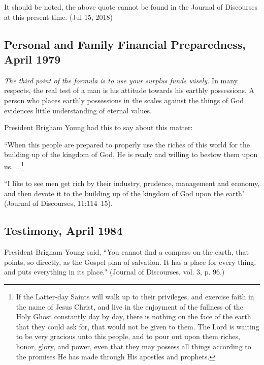 It should be noted, the above quote cannot be found in the Journal of Discourses at this present time. (Jul 15, 2018)

\subsection{Personal and Family Financial Preparedness, April 1979}

\textit{The third point of the formula is to use your surplus funds wisely.} In many respects, the real test of a man is his attitude towards his earthly possessions. A person who places earthly possessions in the scales against the things of God evidences little understanding of eternal values.

President Brigham Young had this to say about this matter:

``When this people are prepared to properly use the riches of this world for the building up of the kingdom of God, He is ready and willing to bestow them upon us. ...\footnote{If the Latter-day Saints will walk up to their privileges, and exercise faith in the name of Jesus Christ, and live in the enjoyment of the fullness of the Holy Ghost constantly day by day, there is nothing on the face of the earth that they could ask for, that would not be given to them. The Lord is waiting to be very gracious unto this people, and to pour out upon them riches, honor, glory, and power, even that they may possess all things according to the promises He has made through His apostles and prophets.}

``I like to see men get rich by their industry, prudence, management and economy, and then devote it to the building up of the kingdom of God upon the earth" (Journal of Discourses, 11:114–15).

\subsection{Testimony, April 1984}

President Brigham Young said, ``You cannot find a compass on the earth, that points, so directly, as the Gospel plan of salvation. It has a place for every thing, and puts everything in its place." (Journal of Discourses, vol. 3, p. 96.)